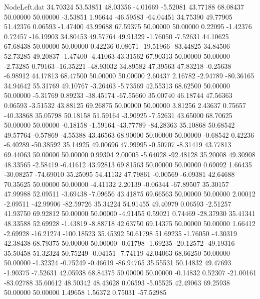 \begin{filecontents}{NodeLeft.dat}
  34.70324   53.53851   48.03356    -4.01669   -5.52081   43.77188   68.08437   50.00000   50.00000   -3.53851    1.96644  -46.59583  -64.04451
  34.75390   49.77905   51.42376     0.06593   -1.47400   43.99688   67.59375   50.00000   50.00000    0.22095   -1.42376    0.72457  -16.19903
  34.80453   49.57764   49.91329    -1.76050   -7.52631   44.10625   67.68438   50.00000   50.00000    0.42236    0.08671  -19.51966  -83.44825
  34.84506   52.73285   49.20837    -1.47400   -4.41063   43.31562   67.90313   50.00000   50.00000   -2.73285    0.79163  -16.35221  -48.93032
  34.89582   47.39563   47.83218    -0.25638   -6.98912   44.17813   68.47500   50.00000   50.00000    2.60437    2.16782   -2.94789  -80.36165
  34.94642   55.31769   49.10767    -3.26463   -5.73569   42.55313   68.62500   50.00000   50.00000   -5.31769    0.89233  -38.45174  -67.55660
  35.00740   46.18744   47.56363     0.06593   -3.51532   43.88125   69.26875   50.00000   50.00000    3.81256    2.43637    0.75657  -40.33868
  35.05798   50.18158   51.59164    -3.90925   -7.52631   43.65000   68.70625   50.00000   50.00000   -0.18158   -1.59164  -43.77789  -84.28363
  35.10868   50.68542   49.57764    -0.57869   -4.55388   43.46563   68.90000   50.00000   50.00000   -0.68542    0.42236   -6.40289  -50.38592
  35.14925   49.00696   47.99995    -0.50707   -8.31419   43.77813   69.44063   50.00000   50.00000    0.99304    2.00005   -5.64028  -92.48128
  35.20008   49.30908   48.33565    -2.58419   -6.41612   43.92813   69.81563   50.00000   50.00000    0.69092    1.66435  -30.08257  -74.69010
  35.25095   54.41132   47.79861    -0.00569   -6.09381   42.64688   70.35625   50.00000   50.00000   -4.41132    2.20139   -0.06344  -67.89507
  35.30157   47.99988   52.09511    -3.69438   -7.09656   43.41875   69.66563   50.00000   50.00000    2.00012   -2.09511  -42.99906  -82.59726
  35.34224   54.91455   49.40979     0.06593   -2.51257   41.93750   69.92812   50.00000   50.00000   -4.91455    0.59021    0.74469  -28.37930
  35.41341   48.33588   52.69928    -1.43819   -8.88718   42.63750   69.14375   50.00000   50.00000    1.66412   -2.69928  -16.21274 -100.18523
  35.45392   50.61798   51.69235    -1.76050   -4.30319   42.38438   68.79375   50.00000   50.00000   -0.61798   -1.69235  -20.12572  -49.19316
  35.50458   51.32324   50.75249    -0.04151   -7.74119   42.04063   68.66250   50.00000   50.00000   -1.32324   -0.75249   -0.46619  -86.94765
  35.55531   50.14832   49.47693    -1.90375   -7.52631   42.05938   68.84375   50.00000   50.00000   -0.14832    0.52307  -21.00161  -83.02788
  35.60612   48.50342   48.43628     0.06593   -5.05525   42.49063   69.25938   50.00000   50.00000    1.49658    1.56372    0.75031  -57.52985

\end{filecontents}
